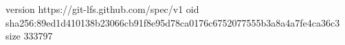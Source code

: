 version https://git-lfs.github.com/spec/v1
oid sha256:89ed1d410138b23066cb91f8e95d78ca0176c6752077555b3a8a4a7fe4ca36c3
size 333797
